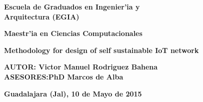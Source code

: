 \begin{center}
\Large
\textbf{Escuela de Graduados en Ingenier'ia y\\ Arquitectura (EGIA)}\\
\vspace{20 pt}

\textbf{Maestr'ia en Ciencias Computacionales}\\
\vspace{42 pt}

\Huge
\textbf{Methodology for design of self sustainable IoT network}\\
\vspace{65 pt}

\Large
\begin{flushleft}
\hspace{5pt}\textbf{AUTOR: Victor Manuel Rodriguez Bahena}\\
\vspace{5pt}
\hspace{5pt}\textbf{ASESORES:PhD Marcos de Alba} \\
\end{flushleft}

\large
\vspace{20pt}
\textbf{Guadalajara (Jal), 10 de Mayo de 2015}
\end{center}
\clearpage

\renewcommand{\baselinestretch}{1.5}

